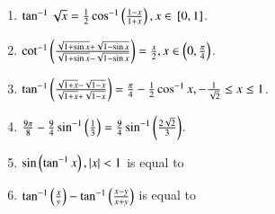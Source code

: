 \begin{enumerate}[label=\thesubsection.\arabic*,ref=\thesubsection.\theenumi,resume*,itemsep=1ex]
	\item 
		$\tan^{-1}\sqrt{x}=\frac{1}{2}\cos^{-1}\left(\frac{1-x}{1+x}\right), x \in {}\left[0,1\right]$.
	\item 
		$\cot^{-1}\left(\frac{\sqrt{1+\sin x}+\sqrt{1-\sin x}}{{\sqrt{1+\sin x}-\sqrt{1-\sin x}}}\right)=\frac{x}{2}, x \in \left(0,\frac{\pi}{4}\right)$.
	\item 
		$\tan^{-1}\left(\frac{\sqrt{1+ x}-\sqrt{1- x}}{{\sqrt{1+ x}+\sqrt{1- x}}}\right)=\frac{\pi}{4}-\frac{1}{2}\cos^{-1}x, -\frac{1}{\sqrt{2}} \le x \le 1$.
	\item 	$\frac{9\pi}{8}-\frac{9}{4}\sin^{-1}\left(\frac{1}{3}\right)=\frac{9}{4}\sin^{-1}\left(\frac{2\sqrt{2}}{3}\right)$.
	\item $\sin\left(\tan^{-1}x\right), \left\vert x\right\vert<1$ is equal to
\begin{enumerate}
\end{enumerate}
	\item 
		$\tan^{-1}\left(\frac{x}{y}\right)-\tan^{-1}\left(\frac{x-y}{x+y}\right)$ is equal to
\begin{enumerate}
\end{enumerate}
\end{enumerate}
